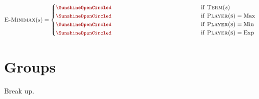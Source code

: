 \documentclass[10pt]{article}
\begin{document}
\[ \msc{E-Minimax}(s) = \begin{cases} 
  \censorm{\msc{Utility}(s)} & \mathrm{if\ } \msc{Term}(s)  \\
  \censorm{\max_{a \in \msc{Act}(s) } \msc{E-Minimax}(\msc{Res}(s, a))} & \mathrm{if\ } \msc{Player(s)} = \mathrm{Max}  \\
  \censorm{\min_{a \in \msc{Act}(s) } \msc{E-Minimax}(\msc{Res}(s, a))} & \mathrm{if\ } \msc{Player(s)} = \mathrm{Min} \\ 
  \censorm{\sum_{a \in \msc{Act}(s) } p(a | s) \msc{E-Minimax}(\msc{Res}(s, a))} & \mathrm{if\ } \msc{Player(s)} = \mathrm{Exp} \end{cases}\] 

\section{Groups}

Break up.


\end{document}
